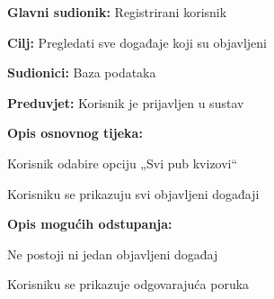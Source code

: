 				
				\noindent {}
				\begin{packed_item}
					
					\item \textbf{Glavni sudionik:} Registrirani korisnik
					\item  \textbf{Cilj:} Pregledati sve događaje koji su objavljeni
					\item  \textbf{Sudionici:} Baza podataka
					\item  \textbf{Preduvjet:} Korisnik je prijavljen u sustav
					\item  \textbf{Opis osnovnog tijeka:}
					
					\item[] \begin{packed_enum}
						
						\item Korisnik odabire opciju „Svi pub kvizovi“
						\item Korisniku se prikazuju svi objavljeni događaji
						
					\end{packed_enum}
					
					\item  \textbf{Opis mogućih odstupanja:}
					
					\item[] \begin{packed_item}
						
						\item[2.a] Ne postoji ni jedan objavljeni događaj
						\item[] \begin{packed_enum}
							
							\item Korisniku se prikazuje odgovarajuća poruka
							
						\end{packed_enum}
						
					\end{packed_item}
				\end{packed_item}
				
